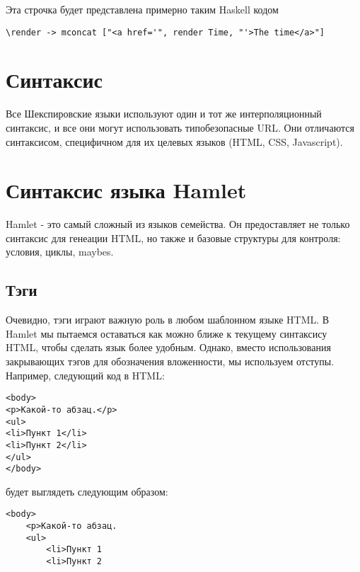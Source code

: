 Эта строчка будет представлена примерно таким Haskell кодом 

\begin{lstlisting}
\render -> mconcat ["<a href='", render Time, "'>The time</a>"]     
\end{lstlisting}

\section{Синтаксис}
Все Шекспировские языки используют один и тот же интерполяционный синтаксис, 
и все они могут использовать типобезопасные URL. Они отличаются синтаксисом,
специфичном для их целевых языков (HTML, CSS, Javascript).

\section{Синтаксис языка Hamlet}
Hamlet - это самый сложный из языков семейства. Он предоставляет не только 
синтаксис для генеации HTML, но также и базовые структуры для контроля: 
условия, циклы, maybes.

\subsection{Тэги}
Очевидно, тэги играют важную роль в любом шаблонном языке HTML. В Hamlet
мы пытаемся оставаться как можно ближе к текущему синтаксису HTML, чтобы
сделать язык более удобным. Однако, вместо использования закрывающих тэгов
для обозначения вложенности, мы используем отступы. Например, следующий код
в HTML:

\begin{lstlisting}
<body>                                                                          
<p>Какой-то абзац.</p>                                                          
<ul>                                                                            
<li>Пункт 1</li>                                                                 
<li>Пункт 2</li>                                                                 
</ul>                                                                           
</body>   
\end{lstlisting}

будет выглядеть следующим образом:
\begin{lstlisting}
<body>                                                                          
    <p>Какой-то абзац.
    <ul>                                                                        
        <li>Пункт 1                                                              
        <li>Пункт 2    
\end{lstlisting}

